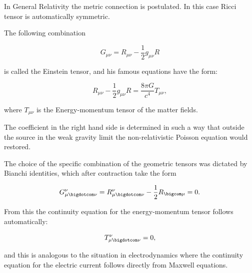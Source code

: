 In General Relativity the metric connection is postulated. In this case Ricci tensor is automatically symmetric.



The following combination

\begin{equation}

\label{tein}

G_{\mu \nu} = R_{\mu \nu} - \frac{1}{2} g_{\mu \nu} R

\end{equation}

is called the Einstein tensor, and his famous equations have the form:

\begin{equation}

\label{eine}

R_{\mu \nu} - \frac{1}{2} g_{\mu \nu} R = \frac{8 \pi G}{c^4} T_{\mu \nu} ,

\end{equation}

where $T_{\mu \nu}$ is the Energy-momentum tensor of the matter fields. 

The coefficient in the right hand side is determined in such a way that outside the source in the weak gravity limit the non-relativistic Poisson equation would restored. 

The choice of the specific combination of the geometric tensors was dictated by Bianchi identities, which after contraction take the form

\begin{equation}

\label{ib}

G^{\nu}_{\mu \bigdotcom \nu} = R^{\nu}_{\mu \bigdotcom \nu} - \frac{1}{2} R_{\bigcom \mu} = 0 .

\end{equation}

From this the continuity equation for the energy-momentum tensor follows auto\-ma\-tically:

\begin{equation}

\label{ce}

T^{\nu}_{\mu \bigdotcom \nu} = 0 ,

\end{equation}

and this is analogous to the situation in electrodynamics where the continuity equation for the electric current follows directly from Maxwell equations. 

